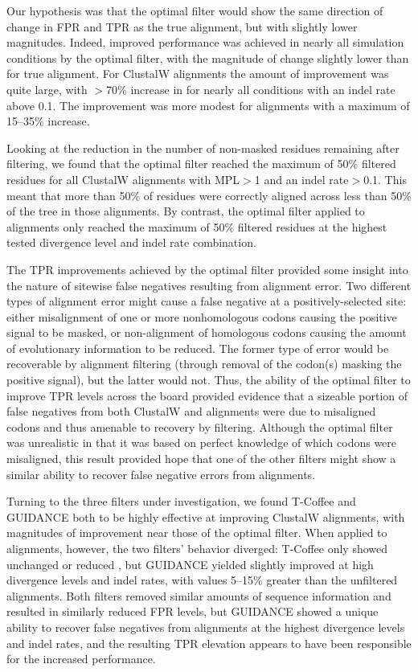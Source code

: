 \documentclass{article}
\begin{document}
Our hypothesis was that the optimal filter would show the same
direction of change in FPR and TPR as the true alignment, but with
slightly lower magnitudes. Indeed, improved \sw performance was
achieved in nearly all simulation conditions by the optimal filter,
with the magnitude of \tpr change slightly lower than for true
alignment. For ClustalW alignments the amount of improvement was quite
large, with $>$70\% increase in \tpr for nearly all conditions with an
indel rate above 0.1. The improvement was more modest for \prankc
alignments with a maximum of 15--35\% \tpr increase.

Looking at the reduction in the number of non-masked residues
remaining after filtering, we found that the optimal filter reached
the maximum of 50\% filtered residues for all ClustalW alignments with
MPL$>$1 and an indel rate$>$0.1. This meant that more than 50\% of
residues were correctly aligned across less than 50\% of the tree in
those alignments. By contrast, the optimal filter applied to \prankc
alignments only reached the maximum of 50\% filtered residues at the
highest tested divergence level and indel rate combination.

The TPR improvements achieved by the optimal filter provided some
insight into the nature of sitewise false negatives resulting from
alignment error. Two different types of alignment error might cause a
false negative at a positively-selected site: either misalignment of
one or more nonhomologous codons causing the positive signal to be
masked, or non-alignment of homologous codons causing the amount of
evolutionary information to be reduced. The former type of error would
be recoverable by alignment filtering (through removal of the codon(s)
masking the positive signal), but the latter would not. Thus, the
ability of the optimal filter to improve TPR levels across the board
provided evidence that a sizeable portion of false negatives from both
ClustalW and \prankc alignments were due to misaligned codons and thus
amenable to recovery by filtering. Although the optimal filter was
unrealistic in that it was based on perfect knowledge of which codons
were misaligned, this result provided hope that one of the other
filters might show a similar ability to recover false negative errors
from \prankc alignments.

Turning to the three filters under investigation, we found T-Coffee
and GUIDANCE both to be highly effective at improving ClustalW
alignments, with magnitudes of improvement near those of the optimal
filter. When applied to \prankc alignments, however, the two filters'
behavior diverged: T-Coffee only showed unchanged or reduced \tpr, but
GUIDANCE yielded slightly improved \tpr at high divergence levels and
indel rates, with values 5--15\% greater than the unfiltered \prankc
alignments. Both filters removed similar amounts of sequence
information and resulted in similarly reduced FPR levels, but GUIDANCE
showed a unique ability to recover false negatives from \prankc
alignments at the highest divergence levels and indel rates, and the
resulting TPR elevation appears to have been responsible for the
increased \tpr performance.
\end{document}
